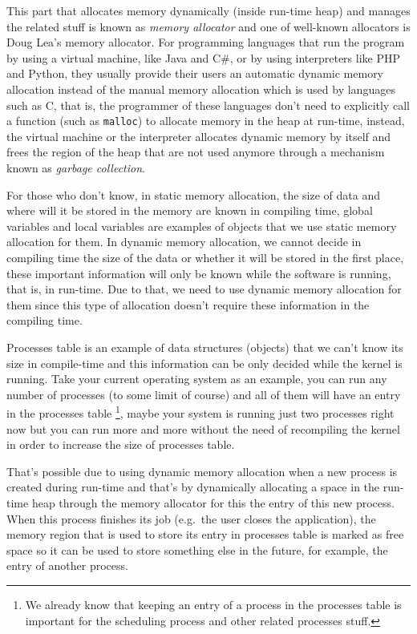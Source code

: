 This part that allocates memory dynamically (inside run-time heap) and
manages the related stuff is known as \emph{memory allocator} and one of
well-known allocators is Doug Lea's memory allocator. For programming
languages that run the program by using a virtual machine, like Java and
C\#, or by using interpreters like PHP and Python, they usually provide
their users an automatic dynamic memory allocation instead of the manual
memory allocation which is used by languages such as C, that is, the
programmer of these languages don't need to explicitly call a function
(such as \lstinline!malloc!) to allocate memory in the heap at run-time,
instead, the virtual machine or the interpreter allocates dynamic memory
by itself and frees the region of the heap that are not used anymore
through a mechanism known as \emph{garbage collection}.

For those who don't know, in static memory allocation, the size of data
and where will it be stored in the memory are known in compiling time,
global variables and local variables are examples of objects that we use
static memory allocation for them. In dynamic memory allocation, we
cannot decide in compiling time the size of the data or whether it will
be stored in the first place, these important information will only be
known while the software is running, that is, in run-time. Due to that,
we need to use dynamic memory allocation for them since this type of
allocation doesn't require these information in the compiling time.

Processes table is an example of data structures (objects) that we can't
know its size in compile-time and this information can be only decided
while the kernel is running. Take your current operating system as an
example, you can run any number of processes (to some limit of course)
and all of them will have an entry in the processes table \footnote{We
  already know that keeping an entry of a process in the processes table
  is important for the scheduling process and other related processes
  stuff.}, maybe your system is running just two processes right now but
you can run more and more without the need of recompiling the kernel in
order to increase the size of processes table.

That's possible due to using dynamic memory allocation when a new
process is created during run-time and that's by dynamically allocating
a space in the run-time heap through the memory allocator for this the
entry of this new process. When this process finishes its job (e.g.~the
user closes the application), the memory region that is used to store
its entry in processes table is marked as free space so it can be used
to store something else in the future, for example, the entry of another
process.

